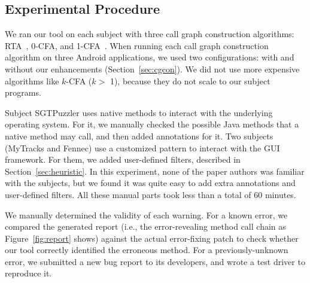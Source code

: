 \smallstep
\tinystep

\subsection{Experimental Procedure}
\label{sec:procedural}

We ran our tool on each subject with three call graph construction
algorithms: RTA~\cite{rta}, 0-CFA, and 1-CFA~\cite{kcfa}.  When running
each call graph construction algorithm on three Android applications, we
used two configurations: with and without our enhancements
(Section~\ref{sec:cgcon}).  We did not use more expensive algorithms like $k$-CFA ($k >$ 1),
because they do not scale to our subject programs.

Subject SGTPuzzler uses native methods to interact with
the underlying operating system. For it, we manually checked the possible
Java methods that a native method may call, and then added \annotationnum {}
annotations for it. 
Two subjects (MyTracks and Fennec)
use a customized pattern to interact with the GUI framework.
For them, we added \filternum user-defined filters, described in Section~\ref{sec:heuristic}.
In this experiment, none of the paper
authors was familiar with the subjects, but we found it was quite easy
to add extra annotations and user-defined filters. All these
manual parts took less than a total of 60 minutes.

We manually determined the validity of each warning.
For a known error, we compared the generated report (i.e., the
error-revealing method call chain as Figure~\ref{fig:report} shows) against the
actual error-fixing patch to check whether our tool correctly identified the
erroneous method. For a previously-unknown error, we submitted a new bug
report to its developers, and wrote a test driver to reproduce it.


